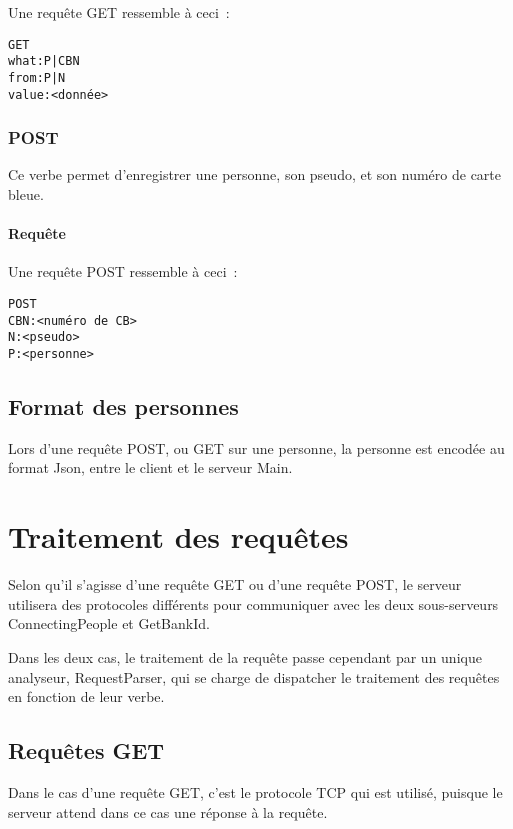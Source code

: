 \documentclass[a4paper,11pt,french]{article}
\begin{document}
            Une requête GET ressemble à ceci~:
            
            \begin{verbatim}
GET
what:P|CBN
from:P|N
value:<donnée>
            \end{verbatim}
            
            
            
      \subsubsection{POST}
      
         Ce verbe permet d'enregistrer une personne, son pseudo, et son numéro
         de carte bleue.
         
         \paragraph{Requête}
         
         Une requête POST ressemble à ceci~:

         \begin{verbatim}
POST
CBN:<numéro de CB>
N:<pseudo>
P:<personne>
         \end{verbatim}

\subsection{Format des personnes}
Lors d'une requête POST, ou GET sur une personne, la personne est
encodée au format Json, entre le client et le serveur Main.

\section{Traitement des requêtes}
Selon qu'il s'agisse d'une requête GET ou d'une requête POST, le serveur
utilisera des protocoles différents pour communiquer avec les deux sous-serveurs
ConnectingPeople et GetBankId.

Dans les deux cas, le traitement de la requête passe cependant par un unique
analyseur, RequestParser, qui se charge de dispatcher le traitement des requêtes
en fonction de leur verbe.

 \subsection{Requêtes GET}
 Dans le cas d'une requête GET, c'est le protocole TCP qui est utilisé, puisque
 le serveur attend dans ce cas une réponse à la requête.
 
\end{document}
